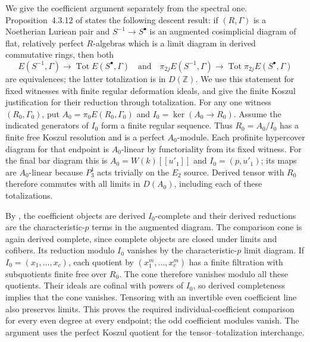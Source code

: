 \documentclass[11pt]{article}
\numberwithin{equation}{section}
\theoremstyle{definition}
\theoremstyle{remark}
\begin{document}
We give the coefficient argument separately from the spectral one.
Proposition~4.3.12 of \cite{BMR2026} states the following descent result:
if $(R,\Gamma)$ is a Noetherian Luriean pair and
$S^{-1}\to S^{\bullet}$ is an augmented cosimplicial diagram of flat,
relatively perfect $R$-algebras which is a limit diagram in derived
commutative rings, then both
\[
 E(S^{-1},\Gamma)\longrightarrow
       \operatorname{Tot} E(S^{\bullet},\Gamma)
 \quad\text{and}\quad
 \pi_{2j}E(S^{-1},\Gamma)\longrightarrow
       \operatorname{Tot}\pi_{2j}E(S^{\bullet},\Gamma)
\]
are equivalences; the latter totalization is in $D(\mathbb Z)$.
We use this statement for fixed witnesses with finite regular deformation
ideals, and give the finite Koszul justification for their reduction
through totalization.
For any one witness $(R_0,\Gamma_0)$, put
$A_0=\pi_0E(R_0,\Gamma_0)$ and $I_0=\ker(A_0\to R_0)$.
Assume the indicated generators of $I_0$ form a finite regular sequence.
Thus $R_0=A_0/I_0$ has a finite free Koszul resolution and is a perfect
$A_0$-module. Each profinite hypercover diagram for that endpoint is
$A_0$-linear by functoriality from its fixed witness. For the final bar diagram this is
$A_0=W(k)[[u'_1]]$ and $I_0=(p,u'_1)$; its maps are $A_0$-linear
because $P_3^1$ acts trivially on the $E_2$ source.
Derived tensor with $R_0$ therefore commutes with all limits in
$D(A_0)$, including each of these totalizations.

By \cite[Lemma~4.2.12]{BMR2026}, the coefficient objects are derived
$I_0$-complete and their derived reductions are the characteristic-$p$
terms in the augmented diagram. The comparison cone is again derived
complete, since complete objects are closed under limits and cofibers.
Its reduction modulo $I_0$ vanishes by the characteristic-$p$ limit
diagram. If $I_0=(x_1,\ldots,x_c)$, each quotient by
$(x_1^m,\ldots,x_c^m)$ has a finite filtration with subquotients finite
free over $R_0$. The cone therefore vanishes modulo all these quotients.
Their ideals are cofinal with powers of $I_0$, so derived completeness
implies that the cone vanishes. Tensoring with an invertible even
coefficient line also preserves limits. This proves the required
individual-coefficient comparison for every even degree at every
endpoint; the odd coefficient modules vanish. The argument uses the
perfect Koszul quotient for the tensor--totalization interchange.
\end{document}
